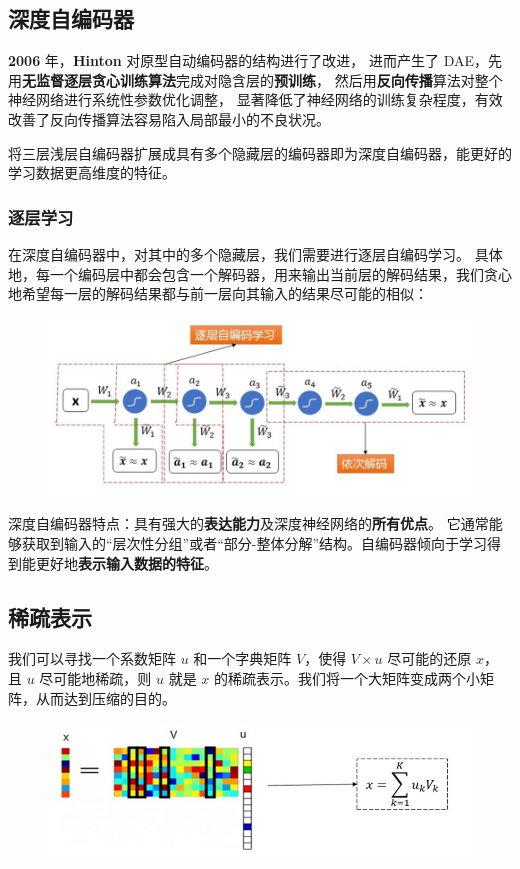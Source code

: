 \subsection{深度自编码器}
\textbf{2006} 年，\textbf{Hinton} 对原型自动编码器的结构进行了改进，
进而产生了 DAE，先用\textbf{无监督逐层贪心训练算法}完成对隐含层的\textbf{预训练}，
然后用\textbf{反向传播}算法对整个神经网络进行系统性参数优化调整，
显著降低了神经网络的训练复杂程度，有效改善了反向传播算法容易陷入局部最小的不良状况。

将三层浅层自编码器扩展成具有多个隐藏层的编码器即为深度自编码器，能更好的学习数据更高维度的特征。

\subsubsection{逐层学习}
在深度自编码器中，对其中的多个隐藏层，我们需要进行逐层自编码学习。
具体地，每一个编码层中都会包含一个解码器，用来输出当前层的解码结果，我们贪心地希望每一层的解码结果都与前一层向其输入的结果尽可能的相似：
\begin{figure}[htbp]
    \centering\includegraphics[scale = 0.4]{DAE.png}
\end{figure}

深度自编码器特点：具有强大的\textbf{表达能力}及深度神经网络的\textbf{所有优点}。
它通常能够获取到输入的“层次性分组”或者“部分-整体分解”结构。自编码器倾向于学习得到能更好地\textbf{表示输入数据的特征}。

\subsection{稀疏表示}
我们可以寻找一个系数矩阵 $u$ 和一个字典矩阵 $V$，使得 $V \times u$ 尽可能的还原 $x$，
且 $u$ 尽可能地稀疏，则 $u$ 就是 $x$ 的稀疏表示。我们将一个大矩阵变成两个小矩阵，从而达到压缩的目的。
\begin{figure}[htbp]
    \centering\includegraphics[scale = 0.5]{sparse.png}
\end{figure}

